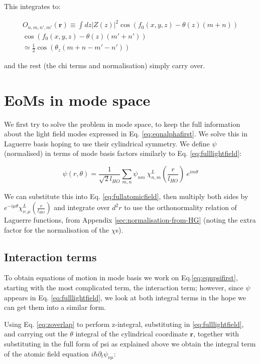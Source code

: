 \documentclass[a4paper,twocolumn,nobalancelastpage]{revtex4-1}
\newcommand{\vect}[1]{\mathbf{#1}}
\newcommand{\lho}{l_{HO}}
\newcommand{\chiaf}{\chi_{\nu,\mu}^L\left(\frac{r}{\lho}\right)}
\begin{document}
This integrates to:

\begin{multline}
\label{eq:zoverlap}
O_{n,m,n',m'}(\vect{r}) \equiv \int dz |Z(z)|^2 \cos\left( f_0(x,y,z)-\theta(z)(m+n) \right) \\ \cos\left( f_0(x,y,z)-\theta(z)(m'+n') \right) \\
 \simeq \frac{1}{2} \cos\left(\theta_z (m+n-m'-n') \right)
\end{multline}

and the rest (the chi terms and normalisation) simply carry over.


\section{EoMs in mode space}

We first try to solve the problem in mode space, to keep the full information about the light field modes expressed in Eq. \ref{eq:eqnalphafirst}. We solve this in Laguerre basis hoping to use their cylindrical symmetry.
We define $\psi$ (normalised) in terms of mode basis factors similarly to Eq. \ref{eq:fulllightfield}:

\begin{equation}
\label{eq:fullatomicfieldmodes}
\psi(r, \theta)=\frac{1}{\sqrt{2}\lho} \sum_{m,n} \psi_{nm} \  \chi_{n,m}^L\left(\frac{r}{\lho}\right)\ e^{im\theta}
\end{equation}

We can substitute this into Eq. \ref{eq:fullatomicfield}, then multiply both sides by $e^{-i \mu \theta} \chiaf$ and integrate over $d^2r$ to use the orthonormality relation of Laguerre functions, from Appendix \ref{sec:normalisation-from-HG} (noting the extra factor for the normalisation of the $\chi$s). 

\subsection{Interaction terms}
To obtain equations of motion in mode basis we work on Eq.\ref{eq:eqnpsifirst}, starting with the most complicated term, the interaction term; however, since $\psi$ appears in Eq. \ref{eq:fulllightfield}, we look at both integral terms in the hope we can get them into a similar form.

Using Eq. \ref{eq:zoverlap} to perform z-integral, substituting in \ref{eq:fulllightfield}, and carrying out the $\theta$ integral of the cylindrical coordinate $\textbf{r}$, together with substituting in the full form of psi as explained above we obtain the integral term of the atomic field equation $i \hbar \partial_t \psi_{\nu\mu}$:
	
\end{document}
